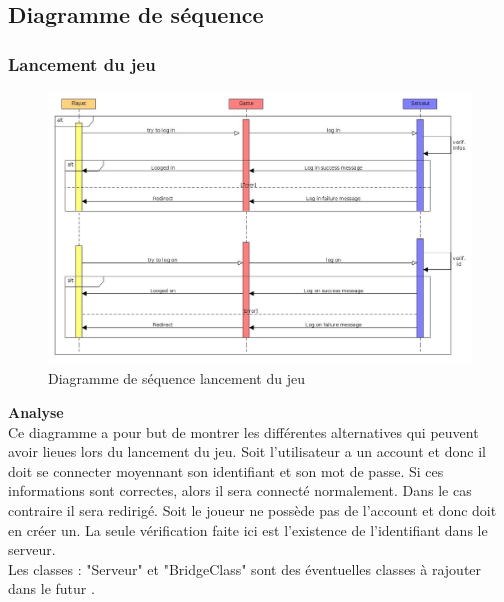 \newpage
\subsection {Diagramme de séquence}
\subsubsection{Lancement du jeu}
\begin{figure}[H]
    \includegraphics[width=1\textwidth,height=0.9\textwidth]{Images/ConnexionSequanceDiagram.jpg}
    \caption{\label{Connexion Sequence Diagramm} Diagramme de séquence lancement du jeu}
\end{figure}
\noindent\textbf{Analyse}\\
{Ce diagramme a pour but de montrer les différentes alternatives qui peuvent avoir lieues lors du lancement du jeu. Soit l'utilisateur a un account et donc il doit se connecter moyennant son identifiant et son mot de passe. Si ces informations sont correctes, alors il sera connecté normalement. Dans le cas contraire il sera redirigé. Soit le joueur ne possède pas de l'account et donc doit en créer un. La seule vérification faite ici est l'existence de l'identifiant dans le serveur.
\\Les classes : "Serveur" et "BridgeClass" sont des éventuelles classes à rajouter dans le futur . 
}
